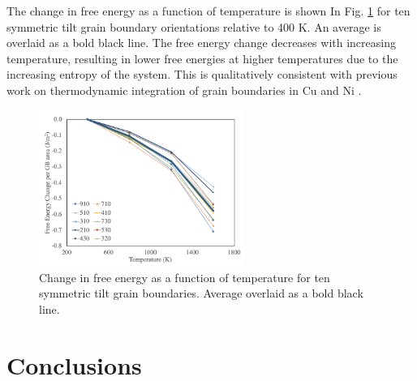 \documentclass[review]{elsarticle}
\begin{document}
The change in free energy as a function of temperature is shown In Fig. \ref{fig:free} for ten symmetric tilt grain boundary orientations relative to 400 K. An average is overlaid as a bold black line. The free energy change decreases with increasing temperature, resulting in lower free energies at higher temperatures due to the increasing entropy of the system. This is qualitatively consistent with previous work on thermodynamic integration of grain boundaries in Cu \cite{frolov2012} and Ni \cite{foiles2010}. 

\begin{figure}[h]
 \centering
 \includegraphics[width=0.6\textwidth]{free.png} 
 \caption{Change in free energy as a function of temperature for ten symmetric tilt grain boundaries. Average overlaid as a bold black line.}
 \label{fig:free}
\end{figure}

\FloatBarrier

\section{Conclusions}
\end{document}
